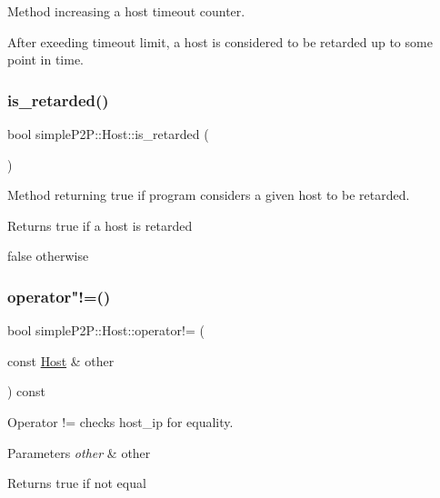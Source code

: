Method increasing a host timeout counter. 

After exeeding timeout limit, a host is considered to be retarded up to some point in time. \mbox{\label{classsimpleP2P_1_1Host_ace84648960b75e127112069be905357c}} 
\subsubsection{\texorpdfstring{is\+\_\+retarded()}{is\_retarded()}}
{\footnotesize\ttfamily bool simple\+P2\+P\+::\+Host\+::is\+\_\+retarded (\begin{DoxyParamCaption}{ }\end{DoxyParamCaption})}



Method returning true if program considers a given host to be retarded. 

\begin{DoxyReturn}{Returns}
true if a host is retarded 

false otherwise 
\end{DoxyReturn}
\mbox{\label{classsimpleP2P_1_1Host_a13516e95bf59bb8dd6eea8940f8bb677}} 
\subsubsection{\texorpdfstring{operator"!=()}{operator!=()}}
{\footnotesize\ttfamily bool simple\+P2\+P\+::\+Host\+::operator!= (\begin{DoxyParamCaption}\item[{const \hyperlink{classsimpleP2P_1_1Host}{Host} \&}]{other }\end{DoxyParamCaption}) const}



Operator != checks host\+\_\+ip for equality. 


\begin{DoxyParams}{Parameters}
{\em other} & other \\
\hline
\end{DoxyParams}
\begin{DoxyReturn}{Returns}
true if not equal 
\end{DoxyReturn}
\mbox{\label{classsimpleP2P_1_1Host_aadac09c6ab516f62e5eebe28dd584626}} 
